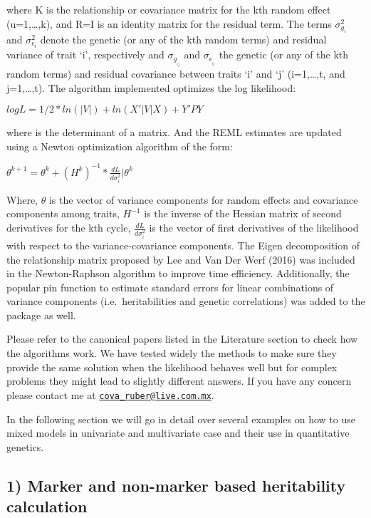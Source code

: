 \documentclass[]{article}
\begin{document}
where K is the relationship or covariance matrix for the kth random
effect (u=1,\ldots{},k), and R=I is an identity matrix for the residual
term. The terms \(\sigma^2_{g_{i}}\) and \(\sigma^2_{\epsilon_{i}}\)
denote the genetic (or any of the kth random terms) and residual
variance of trait `i', respectively and \(\sigma_{g_{_{ij}}}\) and
\(\sigma_{\epsilon_{_{ij}}}\) the genetic (or any of the kth random
terms) and residual covariance between traits `i' and `j'
(i=1,\ldots{},t, and j=1,\ldots{},t). The algorithm implemented
optimizes the log likelihood:

\(logL = 1/2 * ln(|V|) + ln(X'|V|X) + Y'PY\)

where \textbar{}\textbar{} is the determinant of a matrix. And the REML
estimates are updated using a Newton optimization algorithm of the form:

\(\theta^{k+1} = \theta^{k} + (H^{k})^{-1}*\frac{dL}{d\sigma^2_i}|\theta^k\)

Where, \(\theta\) is the vector of variance components for random
effects and covariance components among traits, \(H^{-1}\) is the
inverse of the Hessian matrix of second derivatives for the kth cycle,
\(\frac{dL}{d\sigma^2_i}\) is the vector of first derivatives of the
likelihood with respect to the variance-covariance components. The Eigen
decomposition of the relationship matrix proposed by Lee and Van Der
Werf (2016) was included in the Newton-Raphson algorithm to improve time
efficiency. Additionally, the popular pin function to estimate standard
errors for linear combinations of variance components
(i.e.~heritabilities and genetic correlations) was added to the package
as well.

Please refer to the canonical papers listed in the Literature section to
check how the algorithms work. We have tested widely the methods to make
sure they provide the same solution when the likelihood behaves well but
for complex problems they might lead to slightly different answers. If
you have any concern please contact me at
\href{mailto:cova_ruber@live.com.mx}{\nolinkurl{cova\_ruber@live.com.mx}}.

In the following section we will go in detail over several examples on
how to use mixed models in univariate and multivariate case and their
use in quantitative genetics.

\subsection{1) Marker and non-marker based heritability
calculation}\label{marker-and-non-marker-based-heritability-calculation}
\end{document}
